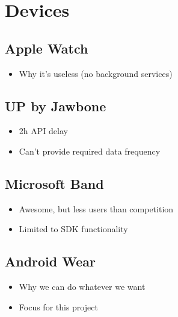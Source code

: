 \section{Devices}
\label{sec:devices}


\subsection{Apple Watch}
\begin{itemize}[noitemsep]
	\item Why it's useless (no background services)
\end{itemize}
\lipsum[1]

\subsection{UP by Jawbone}
\begin{itemize}[noitemsep]
	\item 2h API delay
	\item Can't provide required data frequency
\end{itemize}
\lipsum[1]

\subsection{Microsoft Band}
\begin{itemize}[noitemsep]
	\item Awesome, but less users than competition
	\item Limited to SDK functionality
\end{itemize}
\lipsum[1]

\subsection{Android Wear}
\begin{itemize}[noitemsep]
	\item Why we can do whatever we want
	\item Focus for this project
\end{itemize}
\lipsum[1]
\lipsum[2]
\lipsum[3]


\clearpage